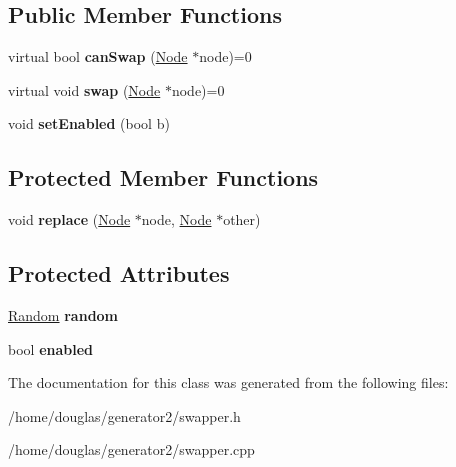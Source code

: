 \subsection*{Public Member Functions}
\begin{DoxyCompactItemize}
\item 
virtual bool {\bfseries can\+Swap} (\hyperlink{classNode}{Node} $\ast$node)=0\hypertarget{classSwapper_a3e40c0156db41717004af48a98c97bee}{}\label{classSwapper_a3e40c0156db41717004af48a98c97bee}

\item 
virtual void {\bfseries swap} (\hyperlink{classNode}{Node} $\ast$node)=0\hypertarget{classSwapper_a0c9f16ac8a863050245d3307d4ab3aea}{}\label{classSwapper_a0c9f16ac8a863050245d3307d4ab3aea}

\item 
void {\bfseries set\+Enabled} (bool b)\hypertarget{classSwapper_a11aab095194ce84106c45142e5952c9a}{}\label{classSwapper_a11aab095194ce84106c45142e5952c9a}

\end{DoxyCompactItemize}
\subsection*{Protected Member Functions}
\begin{DoxyCompactItemize}
\item 
void {\bfseries replace} (\hyperlink{classNode}{Node} $\ast$node, \hyperlink{classNode}{Node} $\ast$other)\hypertarget{classSwapper_a8d100df849fafafb520235999c838c02}{}\label{classSwapper_a8d100df849fafafb520235999c838c02}

\end{DoxyCompactItemize}
\subsection*{Protected Attributes}
\begin{DoxyCompactItemize}
\item 
\hyperlink{classRandom}{Random} {\bfseries random}\hypertarget{classSwapper_aaa71eb757ba363865f1d9e39fe9c6732}{}\label{classSwapper_aaa71eb757ba363865f1d9e39fe9c6732}

\item 
bool {\bfseries enabled}\hypertarget{classSwapper_ab13ddb9c1f01cb9cd18d5ecfcac6b37a}{}\label{classSwapper_ab13ddb9c1f01cb9cd18d5ecfcac6b37a}

\end{DoxyCompactItemize}


The documentation for this class was generated from the following files\+:\begin{DoxyCompactItemize}
\item 
/home/douglas/generator2/swapper.\+h\item 
/home/douglas/generator2/swapper.\+cpp\end{DoxyCompactItemize}
